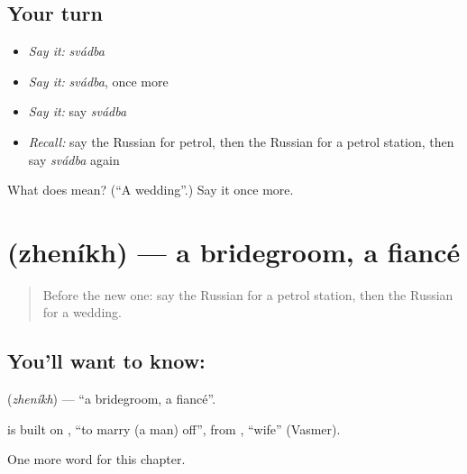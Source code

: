 \subsection*{Your turn}
\begin{itemize}
\raggedright
  \item \emph{Say it:} \emph{svádba}
  \item \emph{Say it:} \emph{svádba}, once more
  \item \emph{Say it:} say \emph{svádba}
  \item \emph{Recall:} say the Russian for petrol, then the Russian for a petrol station, then say \emph{svádba} again
\end{itemize}

\begin{tcolorbox}[breakable,colback=teal!4,colframe=teal!35!black,title={Before you move on}]
What does  mean? (\textquotedblleft{}A wedding\textquotedblright{}.) Say it once more.
\end{tcolorbox}
\section[\texorpdfstring{\ru{жених} (zheníkh)}{жених (zheníkh)}]{ (zheníkh) — a bridegroom, a fiancé}

\label{lesson:RU-C168-zhenikh}



\begin{quote}
Before the new one: say the Russian for a petrol station, then the Russian for a wedding.
\end{quote}

\subsection*{You'll want to know: }
\textbf{} (\emph{zheníkh}) — \textquotedblleft{}a bridegroom, a fiancé\textquotedblright{}.

\begin{cousinweb}
\textbf{} is built on \emph{}, \textquotedblleft{}to marry (a man) off\textquotedblright{}, from \emph{}, \textquotedblleft{}wife\textquotedblright{} (Vasmer).
\end{cousinweb}

\begin{grammarlens}[title={What you've built}]
One more word for this chapter.
\end{grammarlens}

